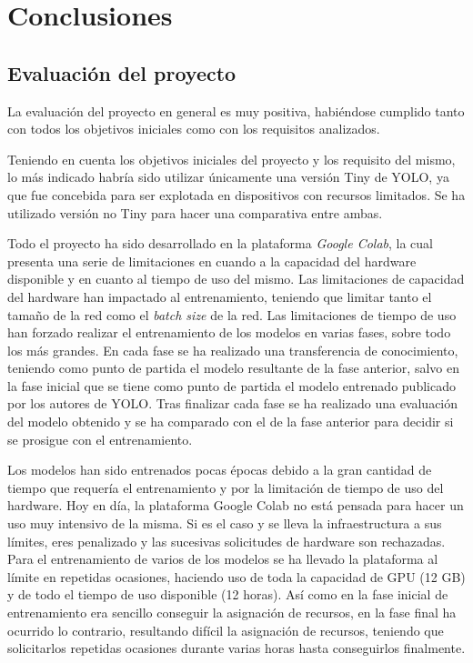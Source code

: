 \section{Conclusiones}
\label{sec:conclusiones}

\subsection{Evaluación del proyecto}

La evaluación del proyecto en general es muy positiva, habiéndose cumplido tanto con todos los objetivos iniciales como con los requisitos analizados.

Teniendo en cuenta los objetivos iniciales del proyecto y los requisito del mismo, lo más indicado habría sido utilizar únicamente una versión Tiny de YOLO, ya que fue concebida para ser explotada en dispositivos con recursos limitados. Se ha utilizado versión no Tiny para hacer una comparativa entre ambas.

Todo el proyecto ha sido desarrollado en la plataforma \textit{Google Colab}, la cual presenta una serie de limitaciones en cuando a la capacidad del hardware disponible y en cuanto al tiempo de uso del mismo. Las limitaciones de capacidad del hardware han impactado al entrenamiento, teniendo que limitar tanto el tamaño de la red como el \textit{batch size} de la red. Las limitaciones de tiempo de uso han forzado realizar el entrenamiento de los modelos en varias fases, sobre todo los más grandes. En cada fase se ha realizado una transferencia de conocimiento, teniendo como punto de partida el modelo resultante de la fase anterior, salvo en la fase inicial que se tiene como punto de partida el modelo entrenado publicado por los autores de YOLO. Tras finalizar cada fase se ha realizado una evaluación del modelo obtenido y se ha comparado con el de la fase anterior para decidir si se prosigue con el entrenamiento.

Los modelos han sido entrenados pocas épocas debido a la gran cantidad de tiempo que requería el entrenamiento y por la limitación de tiempo de uso del hardware. Hoy en día, la plataforma Google Colab no está pensada para hacer un uso muy intensivo de la misma. Si es el caso y se lleva la infraestructura a sus límites, eres penalizado y las sucesivas solicitudes de hardware son rechazadas. Para el entrenamiento de varios de los modelos se ha llevado la plataforma al límite en repetidas ocasiones, haciendo uso de toda la capacidad de GPU (12 GB) y de todo el tiempo de uso disponible (12 horas). Así como en la fase inicial de entrenamiento era sencillo conseguir la asignación de recursos, en la fase final ha ocurrido lo contrario, resultando difícil la asignación de recursos, teniendo que solicitarlos repetidas ocasiones durante varias horas hasta conseguirlos finalmente.

